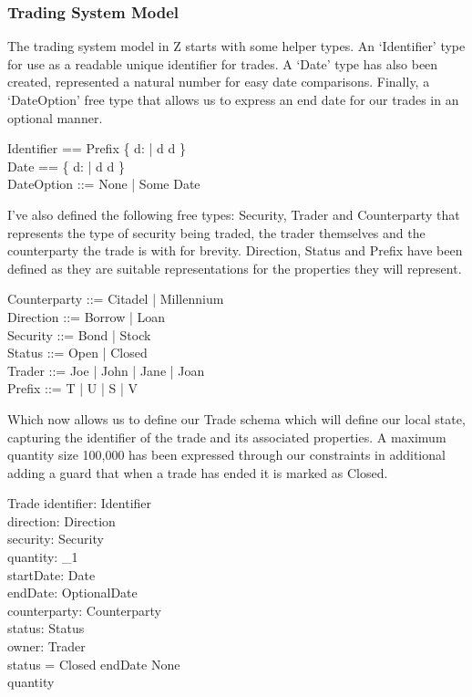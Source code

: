 \documentclass{article}
\begin{document}
\subsubsection*{Trading System Model}

The trading system model in Z starts with some helper types. An ‘Identifier’ type for use as a readable unique identifier for trades. A ‘Date’ type has also been created, represented a natural number for easy date comparisons.  Finally, a ‘DateOption’ free type that allows us to express an end date for our trades in an optional manner.

\begin{zed}
Identifier == Prefix \cross \{ d: \nat | d  \land d  \} \\ 
Date == \{ d: \nat | d  \land d  \} \\
DateOption ::= None | Some \ldata Date \rdata \\
\end{zed}

\hspace{-0.62cm} I've also defined the following free types: Security, Trader and Counterparty that represents the type of security being traded, the trader themselves and the counterparty the trade is with for brevity.  Direction, Status and Prefix have been defined as they are suitable representations for the properties they will represent.

\begin{zed}
Counterparty ::= Citadel | Millennium  \\
Direction ::= Borrow | Loan \\
Security ::= Bond | Stock \\
Status ::= Open | Closed \\  
Trader ::= Joe | John | Jane | Joan \\
Prefix ::= T | U | S | V \\
\end{zed}

\hspace{-0.62cm} Which now allows us to define our Trade schema which will define our local state, capturing the identifier of the trade and its associated properties. A maximum quantity size 100,000 has been expressed through our constraints in additional adding a guard that when a trade has ended it is marked as Closed. 

\begin{schema}{Trade}
identifier: Identifier \\
direction: Direction \\ 
security: Security \\
quantity: \nat_1 \\
startDate: Date \\
endDate: OptionalDate \\ 
counterparty: Counterparty \\
status: Status \\
owner: Trader \\
\where
status = Closed \iff endDate \neq None \\
quantity  \\
\end{schema}
\end{document}
